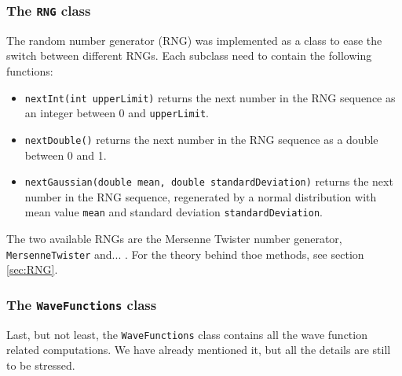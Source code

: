 \subsubsection{The \texttt{RNG} class}
The random number generator (RNG) was implemented as a class to ease the switch between different RNGs. Each subclass need to contain the following functions:
\begin{itemize}
	\item \texttt{nextInt(int upperLimit)} returns the next number in the RNG sequence as an integer between 0 and \texttt{upperLimit}.
	
	\item \texttt{nextDouble()} returns the next number in the RNG sequence as a double between 0 and 1.
	
	\item \texttt{nextGaussian(double mean, double standardDeviation)} returns the next number in the RNG sequence, regenerated by a normal distribution with mean value \texttt{mean} and standard deviation \texttt{standardDeviation}.
\end{itemize}
The two available RNGs are the Mersenne Twister number generator, \texttt{MersenneTwister} and... . For the theory behind thoe methods, see section \eqref{sec:RNG}. 

\subsubsection{The \texttt{WaveFunctions} class}
Last, but not least, the \texttt{WaveFunctions} class contains all the wave function related computations. We have already mentioned it, but all the details are still to be stressed. 

